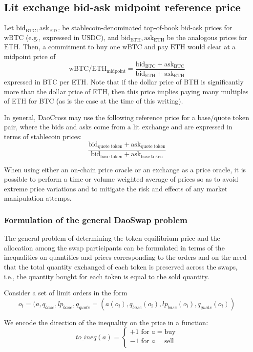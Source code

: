 \documentclass[11pt, reqno]{amsart}
\newcommand{\bidbtc}{\mathrm{bid}_\mathrm{BTC}}
\newcommand{\askbtc}{\mathrm{ask}_\mathrm{BTC}}
\newcommand{\bideth}{\mathrm{bid}_\mathrm{ETH}}
\newcommand{\asketh}{\mathrm{ask}_\mathrm{ETH}}
\newcommand{\bidbase}{\mathrm{bid}_\mathrm{quote\;token}}
\newcommand{\askbase}{\mathrm{ask}_\mathrm{quote\;token}}
\newcommand{\bidquote}{\mathrm{bid}_\mathrm{base\;token}}
\newcommand{\askquote}{\mathrm{ask}_\mathrm{base\;token}}
\newcommand{\BTC}{\mathrm{wBTC}}
\newcommand{\ETH}{\mathrm{ETH}}
\newcommand{\USDC}{\mathrm{USDC}}
\newcommand{\midpoint}{\mathrm{midpoint}}
\begin{document}
\subsection{Lit exchange bid-ask midpoint reference price}
Let $\bidbtc, \askbtc$ be stablecoin-denominated top-of-book bid-ask prices
for $\BTC$ (e.g., expressed in $\USDC$), and $\bideth, \asketh$ be the analogous
prices for $\ETH$. Then, a commitment to buy one $\BTC$ and pay $\ETH$ would
clear at a midpoint price of
\[
	\BTC/\ETH_{\midpoint} = \frac{\bidbtc + \askbtc}{\bideth + \asketh}
\]
expressed in BTC per ETH. Note that if the dollar price of BTH is significantly
more than the dollar price of ETH, then this price implies paying many
multiples of ETH for BTC (as is the case at the time of this writing).

In general, DaoCross may use the following reference price for a base/quote
token pair, where the bids and asks come from a lit exchange and are expressed
in terms of stablecoin prices:
\begin{equation}
	\frac{\bidbase + \askbase}{\bidquote + \askquote}
\end{equation}

When using either an on-chain price oracle or an exchange as a price oracle,
it is possible to perform a time or volume weighted average of prices so as
to avoid extreme price variations and to mitigate the risk and effects of any
market manipulation attemps.

\subsubsection{Formulation of the general DaoSwap problem}
The general problem of determining the token equilibrium price and the
allocation among the swap participants can be formulated in terms of the
inequalities on quantities and prices corresponding to the orders and on the
need that the total quantity exchanged of each token is preserved across the
swaps, i.e., the quantity bought for each token is equal to the sold quantity.

Consider a set of limit orders in the form
$$o_i = (a, q_{base}, lp_{base}, q_{quote} = (a(o_i), q_{base}(o_i), lp_{base}(o_i), q_{quote}(o_i))$$

We encode the direction of the inequality on the price in a function:
$$
\mathit{to\_ineq}(a) =
\begin{cases}
  +1 \text{ for } a = \text{buy} \\
  -1 \text{ for } a = \text{sell} \\
\end{cases}
$$
\end{document}
